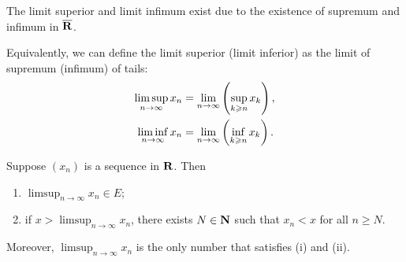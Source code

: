 \begin{remark}
The limit superior and limit infimum exist due to the existence of supremum and infimum in $\overline{\mathbf R}$.
\end{remark}

\begin{lemma}
Equivalently, we can define the limit superior (limit inferior) as the limit of supremum (infimum) of tails:
\begin{align*}
\limsup_{n\to\infty}x_n&=\lim_{n\to\infty}\left(\sup_{k\geqslant n}x_k\right),\\
\liminf_{n\to\infty}x_n&=\lim_{n\to\infty}\left(\inf_{k\geqslant n}x_k\right).
\end{align*}
\end{lemma}

\begin{proposition}
Suppose $(x_n)$ is a sequence in $\mathbf R$. Then
\begin{enumerate}[label=(\roman*)]
\item $\displaystyle\limsup_{n\to\infty}x_n\in E$;
\item if $\displaystyle x>\limsup_{n\to\infty}x_n$, there exists $N\in\mathbf N$ such that $x_n<x$ for all $n\ge N$.
\end{enumerate}
Moreover, $\displaystyle\limsup_{n\to\infty}x_n$ is the only number that satisfies (i) and (ii).
\end{proposition}

